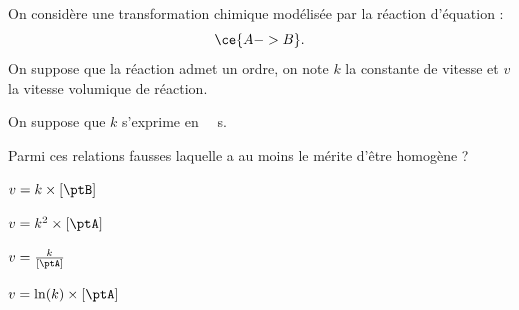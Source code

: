 



\hauteurLargeurCadreReponse		{0.8cm}{2cm}
\initialisationEntrainement

\debutEntrainement

On considère une transformation chimique modélisée par la réaction d'équation :
\[
\ce{A -> B}.
\]
On suppose que la réaction admet un ordre, on note $k$ la constante de vitesse et $v$ la vitesse volumique de réaction.


\begin{enonce}
	On suppose que $k$ s'exprime en \SI{}{\per\second}. 
	
	Parmi ces relations fausses laquelle a au moins le mérite d'être homogène ?
	
	\begin{listeQCM1Colonne}
	\item $v=k\times [\ptB]$
	\item $v=k^2 \times [\ptA]$
	\item $v=\frac{k}{[\ptA]}$
	\item $v=\ln (k)\times[\ptA]$
	\end{listeQCM1Colonne}
\end{enonce}

